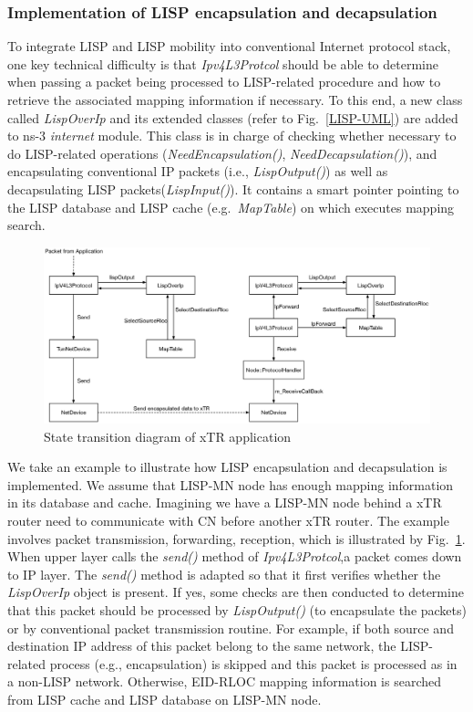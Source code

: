 \subsubsection{Implementation of LISP encapsulation and decapsulation}
To integrate LISP and LISP mobility into conventional Internet protocol stack, one key technical difficulty is that \emph{Ipv4L3Protcol} should be able to determine when passing a packet being processed to LISP-related procedure and how to retrieve the associated mapping information if necessary. To this end, a new class called \emph{LispOverIp} and its extended classes (refer to Fig.~\ref{LISP-UML}) are added to ns-3 \emph{internet} module. This class is in charge of checking whether necessary to do LISP-related operations (\emph{NeedEncapsulation()}, \emph{NeedDecapsulation()}), and encapsulating conventional IP packets (i.e., \emph{LispOutput()}) as well as decapsulating LISP packets(\emph{LispInput()}). It contains a smart pointer pointing to the LISP database and LISP cache (e.g.~\emph{MapTable}) on which executes mapping search.
\begin{figure}[!t]
	\centering
	\includegraphics[width=\textwidth]{Pics/ns3_lisp_data_plane.eps}
	\caption{State transition diagram of xTR application}
	\label{fig:ns3-lisp-data-plane}
\end{figure}

We take an example to illustrate how LISP encapsulation and decapsulation is implemented. We assume that LISP-MN node has enough mapping information in its database and cache.
Imagining we have a LISP-MN node behind a xTR router need to communicate with CN before another xTR router. The example involves packet transmission, forwarding, reception, which is illustrated by Fig.~\ref{fig:ns3-lisp-data-plane}. When upper layer calls the \emph{send()} method of \emph{Ipv4L3Protcol},a packet comes down to IP layer. The \emph{send()} method is adapted so that    
it first verifies whether the \emph{LispOverIp} object is present. If yes, some checks are then conducted to determine that this packet should be processed by \emph{LispOutput()} (to encapsulate the packets) or by conventional packet transmission routine. For example, if both source and destination IP address of this packet belong to the same network, the LISP-related process (e.g., encapsulation) is skipped and this packet is processed as in a non-LISP network. Otherwise, EID-RLOC mapping information is searched from LISP cache and LISP database on LISP-MN node. 



